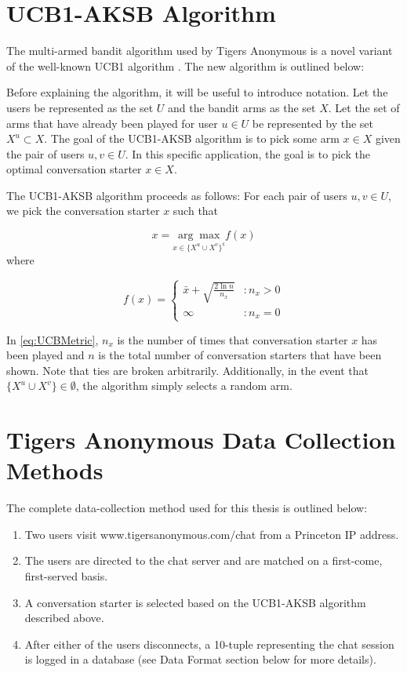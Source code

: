 \section{UCB1-AKSB Algorithm}

The multi-armed bandit algorithm used by Tigers Anonymous is a novel variant of the well-known UCB1 algorithm \citep{auer02}. The new algorithm is outlined below:

Before explaining the algorithm, it will be useful to introduce notation. Let the users be represented as the set $U$ and the bandit arms as the set $X$. Let the set of arms that have already been played for user $u\in{U}$ be represented by the set $X^u \subset{X}$. The goal of the UCB1-AKSB algorithm is to pick some arm $x\in{X}$ given the pair of users $u,v \in{U}$. In this specific application, the goal is to pick the optimal conversation starter $x\in{X}$.

The UCB1-AKSB algorithm proceeds as follows: For each pair of users $u,v\in{U}$, we pick the conversation starter $x$ such that

\begin{equation}
\label{eq:UCBMain}
x = \underset{x \in{\{X^u \cup X^v\}}^{\mathsf{c}}}{\arg\max{}} f(x)
\end{equation}
where

\begin{equation}
\label{eq:UCBMetric}
   f(x) = \left\{
     \begin{array}{lr}
       \bar{x}+ \sqrt{\frac{2\ln{n}}{n_x}} & : n_x > 0\\
       \infty & : n_x = 0
     \end{array}
   \right.
\end{equation}

In \autoref{eq:UCBMetric}, $n_x$ is the number of times that conversation starter $x$ has been played and $n$ is the total number of conversation starters that have been shown. Note that ties are broken arbitrarily. Additionally, in the event that $\{X^u \cup X^v\} \in \emptyset$, the algorithm simply selects a random arm.

\section{Tigers Anonymous Data Collection Methods}

The complete data-collection method used for this thesis is outlined below: 

\begin{enumerate}
\item Two users visit www.tigersanonymous.com/chat from a Princeton IP address.
\item The users are directed to the chat server and are matched on a first-come, first-served basis.
\item A conversation starter is selected based on the UCB1-AKSB algorithm described above.
\item After either of the users disconnects, a 10-tuple representing the chat session is logged in a database (see Data Format section below for more details).
\end{enumerate}

